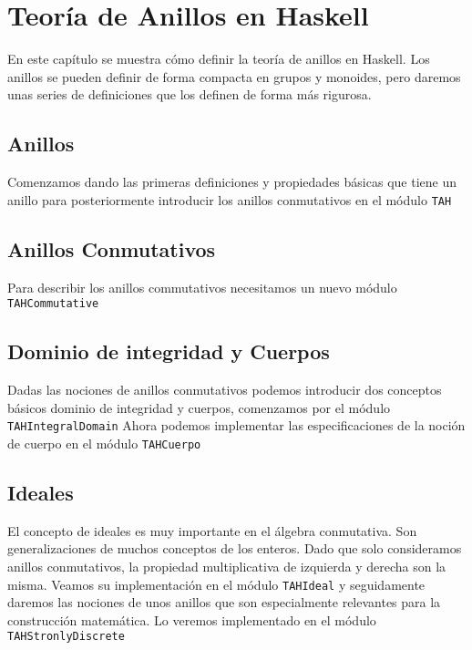 \chapter{Teoría de Anillos en Haskell}

En este capítulo se muestra cómo definir la teoría de anillos en Haskell. Los anillos se pueden definir de forma compacta en grupos y monoides, pero daremos unas series de definiciones que los definen de forma más rigurosa.\\
\section{Anillos}
Comenzamos dando las primeras definiciones y propiedades básicas que tiene un anillo para posteriormente introducir los anillos conmutativos en el módulo \texttt{TAH}

\section{Anillos Conmutativos}
Para describir los anillos commutativos necesitamos un nuevo módulo \texttt{TAHCommutative}
\section{Dominio de integridad y Cuerpos}
Dadas las nociones de anillos conmutativos podemos introducir dos conceptos básicos dominio de integridad y cuerpos, comenzamos por el módulo \texttt{TAHIntegralDomain} Ahora podemos implementar las especificaciones de la noción de cuerpo en el módulo \texttt{TAHCuerpo}

\section{Ideales}
El concepto de ideales es muy importante en el álgebra conmutativa. Son
generalizaciones de muchos conceptos de los enteros. Dado que solo consideramos anillos conmutativos, 
la propiedad multiplicativa de izquierda y derecha son la misma. Veamos su implementación en el módulo \texttt{TAHIdeal}
y seguidamente daremos las nociones de unos anillos que son especialmente relevantes para la construcción matemática. Lo veremos implementado en el módulo \texttt{TAHStronlyDiscrete}

